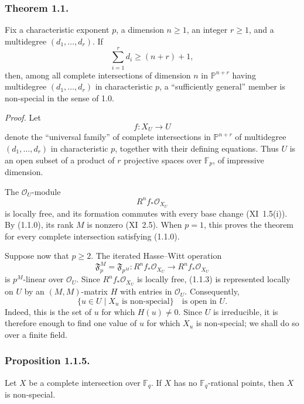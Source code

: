 \subsubsection*{Theorem 1.1.}
Fix a characteristic exponent $p$, a dimension $n\geq1$, an integer
$r\geq1$, and a multidegree $(d_1,\dots,d_r)$.  If
\begin{equation}\tag{1.1.0}
\sum_{i=1}^{r}d_i\geq(n+r)+1,
\end{equation}
then, among all complete intersections of dimension $n$ in
$\mathbb P^{n+r}$ having multidegree $(d_1,\dots,d_r)$ in characteristic
$p$, a ``sufficiently general'' member is non-special in the sense of 1.0.

\medskip
\noindent\emph{Proof.}
Let
\begin{equation}\tag{1.1.1}
f:X_U\longrightarrow U
\end{equation}
denote the ``universal family'' of complete intersections in
$\mathbb P^{n+r}$ of multidegree $(d_1,\dots,d_r)$ in characteristic $p$,
together with their defining equations.  Thus $U$ is an open subset of a
product of $r$ projective spaces over $\mathbb F_p$, of impressive
dimension.

The $\mathcal O_U$-module
\begin{equation}\tag{1.1.2}
R^nf_*\mathcal O_{X_U}
\end{equation}
is locally free, and its formation commutes with every base change
(XI~1.5(i)).  By (1.1.0), its rank $M$ is nonzero (XI~2.5).  When $p=1$,
this proves the theorem for every complete intersection satisfying (1.1.0).

Suppose now that $p\geq2$.  The iterated Hasse--Witt operation
\begin{equation}\tag{1.1.3}
\mathfrak F_p^M=\mathfrak F_{p^M}:
R^nf_*\mathcal O_{X_U}\longrightarrow R^nf_*\mathcal O_{X_U}
\end{equation}
is $p^M$-linear over $\mathcal O_U$.  Since
$R^nf_*\mathcal O_{X_U}$ is locally free, (1.1.3) is represented locally on
$U$ by an $(M,M)$-matrix $H$ with entries in $\mathcal O_U$.  Consequently,
\begin{equation}\tag{1.1.4}
\{u\in U\mid X_u\text{ is non-special}\}\quad\text{is open in }U.
\end{equation}
Indeed, this is the set of $u$ for which $H(u)\ne0$.  Since $U$ is
irreducible, it is therefore enough to find one value of $u$ for which
$X_u$ is non-special; we shall do so over a finite field.

\subsubsection*{Proposition 1.1.5.}
Let $X$ be a complete intersection over $\mathbb F_q$.  If $X$ has no
$\mathbb F_q$-rational points, then $X$ is non-special.


